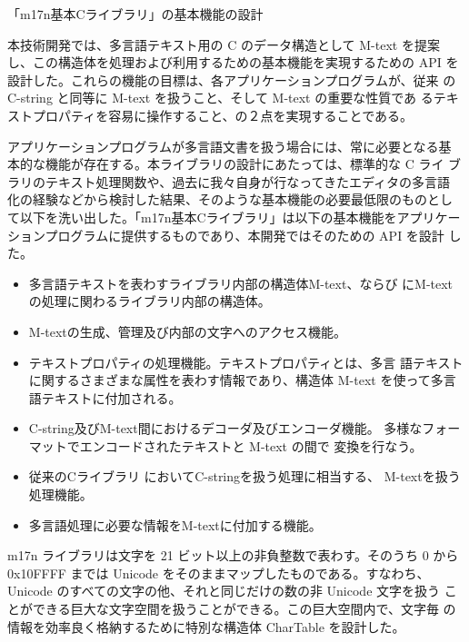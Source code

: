 \item 「m17n基本Cライブラリ」の基本機能の設計

本技術開発では、多言語テキスト用の C のデータ構造として M-text を提案
し、この構造体を処理および利用するための基本機能を実現するための API 
を設計した。これらの機能の目標は、各アプリケーションプログラムが、従来
の C-string と同等に M-text を扱うこと、そして M-text の重要な性質であ
るテキストプロパティを容易に操作すること、の２点を実現することである。

アプリケーションプログラムが多言語文書を扱う場合には、常に必要となる基
本的な機能が存在する。本ライブラリの設計にあたっては、標準的な C ライ
ブラリのテキスト処理関数や、過去に我々自身が行なってきたエディタの多言語
化の経験などから検討した結果、そのような基本機能の必要最低限のものとし
て以下を洗い出した。「m17n基本Cライブラリ」は以下の基本機能をアプリケー
ションプログラムに提供するものであり、本開発ではそのための API を設計
した。

     \begin{itemize}

     \item 多言語テキストを表わすライブラリ内部の構造体M-text、ならび
     にM-textの処理に関わるライブラリ内部の構造体。

     \item M-textの生成、管理及び内部の文字へのアクセス機能。

     \item テキストプロパティの処理機能。テキストプロパティとは、多言
     語テキストに関するさまざまな属性を表わす情報であり、構造体 M-text 
     を使って多言語テキストに付加される。

     \item C-string及びM-text間におけるデコーダ及びエンコーダ機能。
     多様なフォーマットでエンコードされたテキストと M-text の間で
     変換を行なう。

     \item 従来のCライブラリ においてC-stringを扱う処理に相当する、
     M-textを扱う処理機能。

     \item 多言語処理に必要な情報をM-textに付加する機能。

     \end{itemize}

m17n ライブラリは文字を 21 ビット以上の非負整数で表わす。そのうち 0 から 
0x10FFFF までは Unicode をそのままマップしたものである。すなわち、
Unicode のすべての文字の他、それと同じだけの数の非 Unicode 文字を扱う
ことができる巨大な文字空間を扱うことができる。この巨大空間内で、文字毎
の情報を効率良く格納するために特別な構造体 CharTable を設計した。


